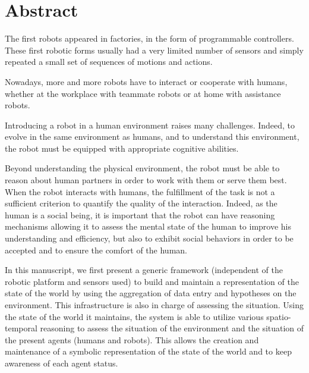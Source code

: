 \documentclass[a4paper,11pt,twoside]{StyleThese}
\begin{document}
\fi


\chapter*{Abstract}

The first robots appeared in factories, 
in the form of programmable controllers.
These first robotic forms usually had a 
very limited number of sensors and simply 
repeated a small set of sequences of motions and actions.

Nowadays, more and more robots have to interact
 or cooperate with humans, whether at the workplace 
 with teammate robots or at home with assistance robots.

Introducing a robot in a human environment raises many challenges.
Indeed, to evolve in the same environment as humans, and to understand 
this environment, the robot must be equipped with appropriate cognitive abilities.

Beyond understanding the physical environment, the robot must 
be able to reason about human partners in order to work with 
them or serve them best. When the robot interacts with humans, 
the fulfillment of the task is not a sufficient criterion to 
quantify the quality of the interaction. Indeed, as the human is a 
social being, it is important that the robot can have reasoning 
mechanisms allowing it to assess the mental state of the human
to improve his understanding and efficiency, but also to exhibit 
social behaviors in order to be accepted and to ensure the comfort of the human.

In this manuscript, we first present a generic framework (independent of the robotic platform and 
sensors used) to build and maintain a representation 
of the state of the world by using the aggregation of data entry 
and hypotheses on the environment. This infrastructure is also 
in charge of assessing the situation. Using the state of the world it maintains, 
the system is able to utilize 
various spatio-temporal reasoning to assess the situation of the environment 
and the situation of the present agents (humans and robots). This allows 
the creation and maintenance of a symbolic representation of the state 
of the world and to keep awareness of each agent status.
\end{document}
